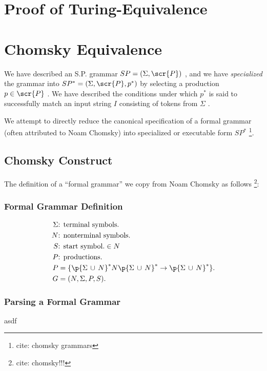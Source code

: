 \documentclass[10pt]{article}
\newcommand{\todocite}[1]{\footnote{cite: #1}}
\begin{document}
\section{Proof of Turing-Equivalence}
\label{sec:proof-of-turing-equivalence}


\section{Chomsky Equivalence}
\label{sec:chomsky-equivalence}
We have described an S.P. grammar $SP = (\Sigma, \scr{P})$ , and we have \textit{specialized} the grammar into $SP^* = (\Sigma, \scr{P}, p^*)$ by selecting a production $p \in \scr{P}$ . We have described the conditions under which $p^*$ is said to successfully match an input string $I$ consisting of tokens from $\Sigma$ .

We attempt to directly reduce the canonical specification of a formal grammar (often attributed to Noam Chomsky) into specialized or executable form $SP^*$ \todocite{chomsky grammars}.

\subsection{Chomsky Construct}
\label{sec:chomsky-construct}
The definition of a ``formal grammar'' we copy from Noam Chomsky as follows \todocite{chomsky!!!}:

\subsubsection{Formal Grammar Definition}
\label{sec:formal-grammar-definition}
\begin{align}
  \label{eq:chomsky-production}
  \Sigma &\text{: terminal symbols.} \\
  N &\text{: nonterminal symbols.} \\
  S &\text{: start symbol.} \in N \\
  P &\text{: productions.} \\
  P &= \{\p{\Sigma\, \cup \, N}^* N \p{\Sigma\, \cup \, N}^* \rightarrow \p{\Sigma\, \cup \, N}^* \}. \\
  G &= (N, \Sigma, P, S).
\end{align}

\subsubsection{Parsing a Formal Grammar}
\label{sec:proof-of-parsing-a-formal-grammar}
asdf
\end{document}
